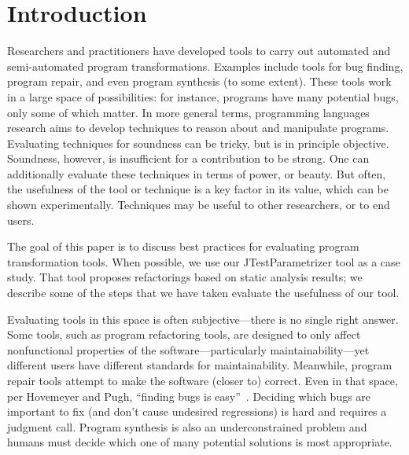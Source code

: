 \section{Introduction}
Researchers and practitioners have developed tools to carry out
automated and semi-automated program transformations.  Examples
include tools for bug finding, program repair, and even 
program synthesis (to some extent). These tools work in a large space of possibilities:
for instance, programs have many potential bugs, only some of which
matter.
In more general terms, programming languages research aims to develop
techniques to reason about and manipulate programs. Evaluating
techniques for soundness can be tricky, but is in principle
objective. Soundness, however, is insufficient for a contribution to
be strong. One can additionally evaluate these techniques in terms of
power, or beauty. But often, the usefulness of the tool or technique
is a key factor in its value, which can be shown
experimentally. Techniques may be useful to other researchers, or to
end users.

The goal of this paper is to discuss best practices for evaluating
program transformation tools. When possible, we use our
JTestParametrizer tool as a case study. That tool proposes
refactorings based on static analysis results; we describe some of the
steps that we have taken evaluate the usefulness of our tool.

Evaluating tools in this space is often subjective---there is no
single right answer. Some tools, such as program refactoring tools,
are designed to only affect nonfunctional properties of the
software---particularly maintainability---yet different users have
different standards for maintainability.  Meanwhile, program repair
tools attempt to make the software (closer to) correct. Even in that
space, per Hovemeyer and Pugh, ``finding bugs is
easy''~\cite{hovemeyer04:_findin_bugs_easy}. Deciding which bugs are
important to fix (and don't cause undesired regressions) is hard and
requires a judgment call. Program synthesis is also an
underconstrained problem and humans must decide which one of many
potential solutions is most appropriate.
